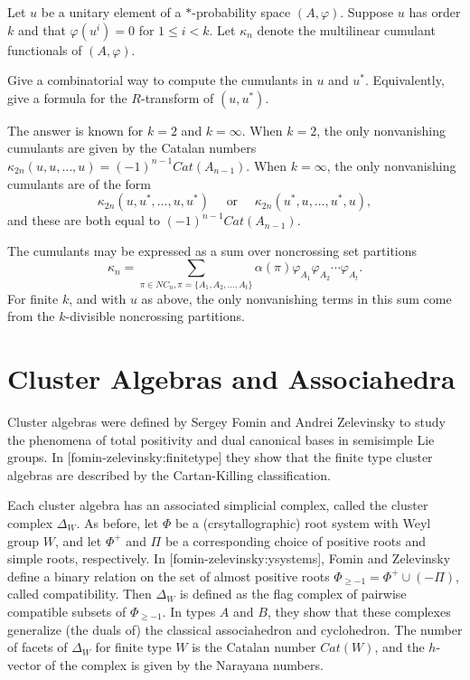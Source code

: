 \documentclass[12pt,letterpaper, reqno]{amsart}
\begin{document}
\begin{problemblock}
\begin{problem}[5.3] 
Let $u$ be a unitary element of a $*$-probability space $( A,\varphi)$. Suppose $u$ has order $k$ and that $\varphi(u^i)=0$ for $1\leq i< k$. Let $\kappa_n$ denote the multilinear cumulant functionals of $( A,\varphi)$.

Give a combinatorial way to compute the cumulants in $u$ and $u^*$. Equivalently, give a formula for the $R$-transform of $(u,u^*)$.
\end{problem}

\begin{remark} The answer is known for $k=2$ and $k=\infty$. When $k=2$, the only nonvanishing cumulants are given by the Catalan numbers $\kappa_{2n}(u,u,\ldots,u)=(-1)^{n-1} Cat(A_{n-1})$. When $k=\infty$, the only nonvanishing cumulants are of the form
$$
\kappa_{2n}(u,u^*,\ldots,u,u^*)\quad\text{ or }\quad \kappa_{2n}(u^*,u,\ldots,u^*,u),
$$
 and these are both equal to $(-1)^{n-1}Cat(A_{n-1})$.
\end{remark}
\begin{remark} The cumulants may be expressed as a sum over noncrossing set partitions
$$
\kappa_n = \sum_{\pi\in NC_n, \pi=\{A_1,A_2,\ldots,A_t\}} \alpha(\pi) \varphi_{A_1}\varphi_{A_2}\cdots \varphi_{A_t}.
$$
For finite $k$, and with $u$ as above, the only nonvanishing terms in this sum come from the $k$-divisible noncrossing partitions.
\end{remark}

\end{problemblock}

\section{Cluster Algebras and Associahedra}
Cluster algebras were defined by Sergey Fomin and Andrei Zelevinsky to study the phenomena of total positivity and dual canonical bases in semisimple Lie groups. In [fomin-zelevinsky:finitetype] they show that the finite type cluster algebras are described by the Cartan-Killing classification.

Each cluster algebra has an associated simplicial complex, called the cluster complex $\Delta_W$. As before, let $\Phi$ be a (crsytallographic) root system with Weyl group $W$, and let $\Phi^+$ and $\Pi$ be a corresponding choice of positive roots and simple roots, respectively. In [fomin-zelevinsky:ysystems], Fomin and Zelevinsky define a binary relation on the set of almost positive roots $\Phi_{\geq -1}= \Phi^+ \cup (-\Pi)$, called compatibility. Then $\Delta_W$ is defined as the flag complex of pairwise compatible subsets of $\Phi_{\geq -1}$. In types $A$ and $B$, they show that these complexes generalize (the duals of) the classical associahedron and cyclohedron. The number of facets of $\Delta_W$ for finite type $W$ is the Catalan number $Cat(W)$, and the $h$-vector of the complex is given by the Narayana numbers.
\end{document}
